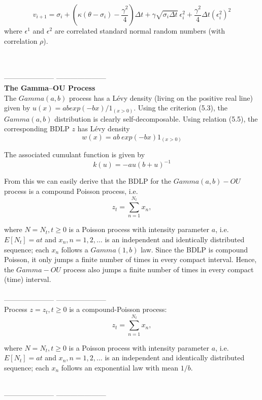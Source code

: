 \begin{equation}
v_{i+1} =  \sigma_i + \left(\kappa(\theta - \sigma_i) - \frac{\gamma^2}{4}\right)\Delta t + \gamma\sqrt{\sigma_i\Delta t} \ \epsilon_{i}^2 + \frac{\gamma^2}{4} \Delta t (\epsilon_{i}^2)^2
\end{equation} 
where $\epsilon^1$ and $\epsilon^2$ are correlated standard normal random numbers (with correlation $\rho$).

~\\~\\---------------------
---------------------\\
\textbf{The Gamma–OU Process}\\
The $Gamma(a, b)$ process has a L\'evy density (living on the positive real line) given by
$u(x) = ab exp(-bx)/1_{(x>0)}$. Using the criterion (5.3), the $Gamma(a, b)$ distribution is clearly self-decomposable. Using relation (5.5), the corresponding BDLP $z$ has L\'evy density
\begin{equation}
w(x) = ab \ exp(-bx)1_{(x>0)}
\end{equation} 

The associated cumulant function is given by
\begin{equation}
k(u) = -au (b + u)^{-1}
\end{equation} 

From this we can easily derive that the BDLP for the $Gamma(a, b)-OU$ process is
a compound Poisson process, i.e.
\begin{equation}
z_t = \sum_{n=1}^{N_t}x_n, 
\end{equation}

where $N = {N_t, t\geq0}$ is a Poisson process with intensity parameter $a$, i.e. $E[N_t] = at$ and ${x_n, n=1,2,\ldots}$ is an independent and identically distributed sequence; each $x_n$ follows a $Gamma(1,b)$ law. Since the BDLP is compound Poisson, it only jumps a finite number of times in every compact interval. Hence, the $Gamma-OU$ process also jumps a finite number of times in every compact (time) interval.
~\\~\\---------------------
---------------------\\
Process $z={z_t, t\geq0}$ is a compound-Poisson process:
\begin{equation}
z_t = \sum_{n=1}^{N_t}x_n, 
\end{equation}

where $N = {N_t, t\geq0}$ is a Poisson process with intensity parameter $a$, i.e. $E[N_t] = at$ and ${x_n, n=1,2,\ldots}$ is an independent and identically distributed sequence; each $x_n$ follows an exponential law with mean $1/b$.

~\\---------------------
---------------------\\
